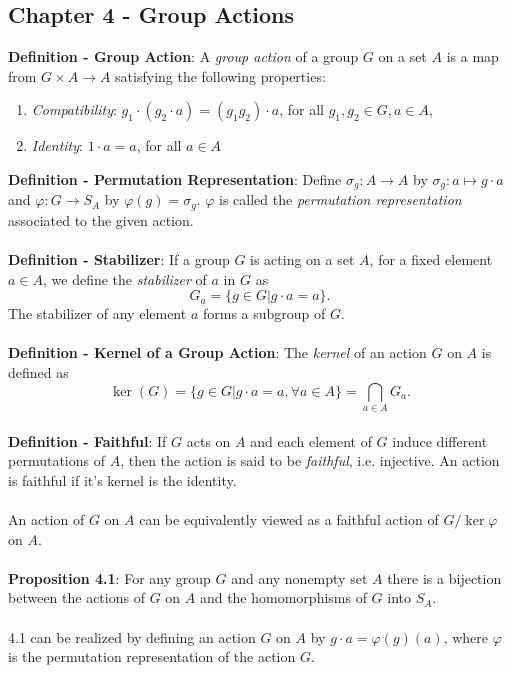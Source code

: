 \documentclass{article}
\begin{document}
\subsection*{Chapter 4 - Group Actions}
\textbf{Definition - Group Action}: A \textit{group action} of a group $G$ on a set $A$ is a map from $G \times A \rightarrow A$ satisfying the following properties: \begin{enumerate}
    \item \textit{Compatibility}: $g_1 \cdot (g_2 \cdot a) = (g_1g_2) \cdot a$, for all $g_1, g_2 \in G, a \in A$,
    \item \textit{Identity}: $1 \cdot a = a$, for all $a \in A$
\end{enumerate} $ $ \\
\textbf{Definition - Permutation Representation}: Define $\sigma_g: A \rightarrow A$ by $\sigma_g: a \mapsto g \cdot a$ and $\varphi: G \rightarrow S_A$ by $\varphi(g) = \sigma_g$. $\varphi$ is called the \textit{permutation representation} associated to the given action. \\ \\
\textbf{Definition - Stabilizer}: If a group $G$ is acting on a set $A$, for a fixed element $a \in A$, we define the \textit{stabilizer} of $a$ in $G$ as $$G_a = \{g \in G | g \cdot a = a\}.$$ The stabilizer of any element $a$ forms a subgroup of $G$. \\ \\
\textbf{Definition - Kernel of a Group Action}: The \textit{kernel} of an action $G$ on $A$ is defined as $$\ker(G) = \{g \in G| g \cdot a = a, \forall a \in A\} = \bigcap_{a \in A} G_a.$$ \\
\textbf{Definition - Faithful}: If $G$ acts on $A$ and each element of $G$ induce different permutations of $A$, then the action is said to be \textit{faithful}, i.e. injective. An action is faithful if it's kernel is the identity. \\ \\
An action of $G$ on $A$ can be equivalently viewed as a faithful action of $G/\ker{\varphi}$ on $A$. \\ \\
\textbf{Proposition 4.1}: For any group $G$ and any nonempty set $A$ there is a bijection between the actions of $G$ on $A$ and the homomorphisms of $G$ into $S_A$. \\ \\
4.1 can be realized by defining an action $G$ on $A$ by $g \cdot a = \varphi(g)(a)$, where $\varphi$ is the permutation representation of the action $G$. \\ \\
\end{document}
